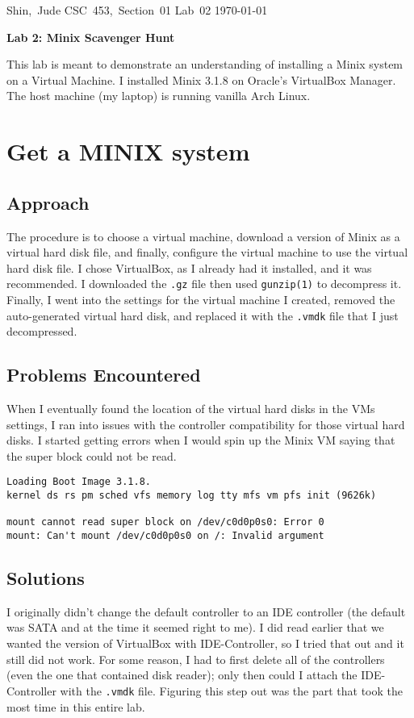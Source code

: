 \documentclass[11pt]{article}
\begin{document}
\hfill\vbox{\hbox{Shin, Jude}
		\hbox{CSC 453, Section 01}	
		\hbox{Lab 02}	
		\hbox{\today}}\par

\bigskip
\centerline{\Large\bf Lab 2: {\sc Minix} Scavenger Hunt}\par
\bigskip

This lab is meant to demonstrate an understanding of installing a {\sc Minix} system on a Virtual Machine. I installed {\sc Minix 3.1.8} on Oracle's {\sc VirtualBox Manager}. The host machine (my laptop) is running vanilla {\sc Arch Linux}.

\setcounter{section}{0}
\section{Get a MINIX system}
\subsection{Approach}
The procedure is to choose a virtual machine, download a version of {\sc Minix} as a virtual hard disk file, and finally, configure the virtual machine to use the virtual hard disk file. I chose {\sc VirtualBox}, as I already had it installed, and it was recommended. I downloaded the {\tt .gz} file then used {\tt gunzip(1)} to decompress it. Finally, I went into the settings for the virtual machine I created, removed the auto-generated virtual hard disk, and replaced it with the {\tt .vmdk} file that I just decompressed. 

\subsection{Problems Encountered}
When I eventually found the location of the virtual hard disks in the VMs settings, I ran into issues with the controller compatibility for those virtual hard disks. I started getting errors when I would spin up the {\sc Minix} VM saying that the super block could not be read. 

\begin{verbatim}
Loading Boot Image 3.1.8.
kernel ds rs pm sched vfs memory log tty mfs vm pfs init (9626k)

mount cannot read super block on /dev/c0d0p0s0: Error 0
mount: Can't mount /dev/c0d0p0s0 on /: Invalid argument
\end{verbatim}

\subsection{Solutions}
I originally didn't change the default controller to an IDE controller (the default was SATA and at the time it seemed right to me). I did read earlier that we wanted the version of {\sc VirtualBox} with IDE-Controller, so I tried that out and it still did not work. For some reason, I had to first delete all of the controllers (even the one that contained disk reader); only then could I attach the IDE-Controller with the {\tt .vmdk} file. Figuring this step out was the part that took the most time in this entire lab. 
\end{document}
